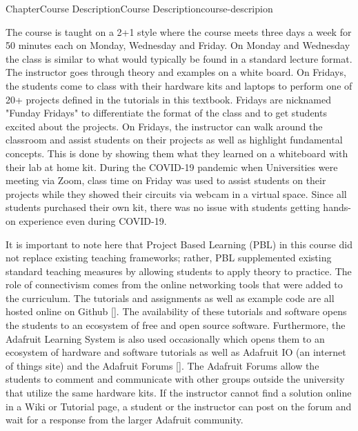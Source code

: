 \documentclass[oneside,10pt,]{book}
\newcommand{\xreffont}{\relax}
\newcommand{\linkhilite}[1]{\underline{#1}}
\numberwithin{equation}{section}
\begin{document}
\begin{chapterptx}{Chapter}{Course Description}{}{Course Description}{}{}{course-descripion}
\begin{introduction}{}
\par
The course is taught on a 2+1 style where the course meets three days a week for 50 minutes each on Monday, Wednesday and Friday. On Monday and Wednesday the class is similar to what would typically be found in a standard lecture format. The instructor goes through theory and examples on a white board. On Fridays, the students come to class with their hardware kits and laptops to perform one of 20+ projects defined in the tutorials in this textbook. Fridays are nicknamed "Funday Fridays" to differentiate the format of the class and to get students excited about the projects. On Fridays, the instructor can walk around the classroom and assist students on their projects as well as highlight fundamental concepts. This is done by showing them what they learned on a whiteboard with their lab at home kit. During the COVID-19 pandemic when Universities were meeting via Zoom, class time on Friday was used to assist students on their projects while they showed their circuits via webcam in a virtual space. Since all students purchased their own kit, there was no issue with students getting hands-on experience even during COVID-19.%
\par
It is important to note here that Project Based Learning (PBL) in this course did not replace existing teaching frameworks; rather, PBL supplemented existing standard teaching measures by allowing students to apply theory to practice. The role of connectivism comes from the online networking tools that were added to the curriculum. The tutorials and assignments as well as example code are all hosted online on Github \hyperlink{Github}{\linkhilite{[{\xreffont 33}]}}. The availability of these tutorials and software opens the students to an ecosystem of free and open source software. Furthermore, the Adafruit Learning System is also used occasionally which opens them to an ecosystem of hardware and software tutorials as well as Adafruit IO (an internet of things site) and the Adafruit Forums \hyperlink{Adafruit}{\linkhilite{[{\xreffont 32}]}}. The Adafruit Forums allow the students to comment and communicate with other groups outside the university that utilize the same hardware kits. If the instructor cannot find a solution online in a Wiki or Tutorial page, a student or the instructor can post on the forum and wait for a response from the larger Adafruit community.%
\par

\end{introduction}
\end{chapterptx}
\end{document}
